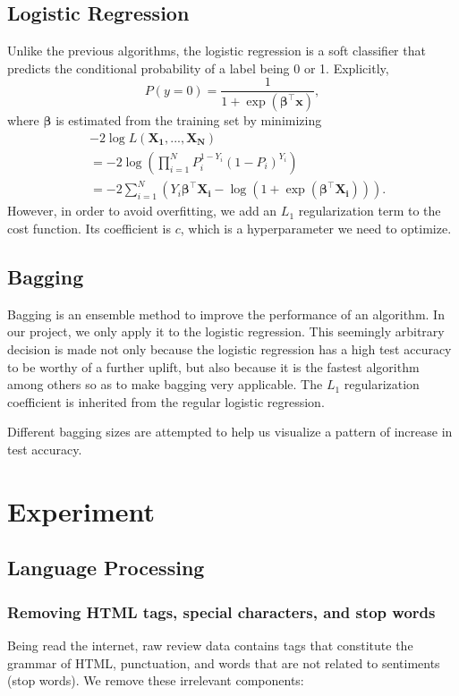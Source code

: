 \documentclass[10pt,twocolumn,letterpage]{article}
\begin{document}
		\subsection{Logistic Regression}
			Unlike the previous algorithms, the logistic regression is a soft classifier that predicts the conditional probability of a label being 0 or 1. Explicitly, 
			$$P(y = 0) = \frac{1}{1+\exp(\bm{\beta^\top}\bm{x})},$$ where $\bm{\beta}$ is estimated from the training set by minimizing \begin{align*}
				&-2\log L(\bm{X_1},...,\bm{X_N}) \\
				&= -2\log (\prod_{i=1}^{N}P_i^{1-Y_i}(1-P_i)^{Y_i})\\
				&= -2\sum_{i=1}^{N}(Y_i\bm{\beta}^\top\bm{X_i} - \log(1+\exp(\bm{\beta}^\top\bm{X_i}))).
			\end{align*} 
			However, in order to avoid overfitting, we add an $L_1$ regularization term to the cost function. Its coefficient is $c$, which is a hyperparameter we need to optimize.
		\subsection{Bagging}
			Bagging is an ensemble method to improve the performance of an algorithm. In our project, we only apply it to the logistic regression. This seemingly arbitrary decision is made not only because the logistic regression has a high test accuracy to be worthy of a further uplift, but also because it is the fastest algorithm among others so as to make bagging very applicable. The $L_1$ regularization coefficient is inherited from the regular logistic regression. 
			
			Different bagging sizes are attempted to help us visualize a pattern of increase in test accuracy. 
		\section{Experiment}	
		\subsection{Language Processing}
		\subsubsection{Removing HTML tags, special characters, and stop words}
		Being read the internet, raw review data contains tags that constitute the grammar of HTML, punctuation, and words that are not related to sentiments (stop words). We remove these irrelevant components: 
			
\end{document}
